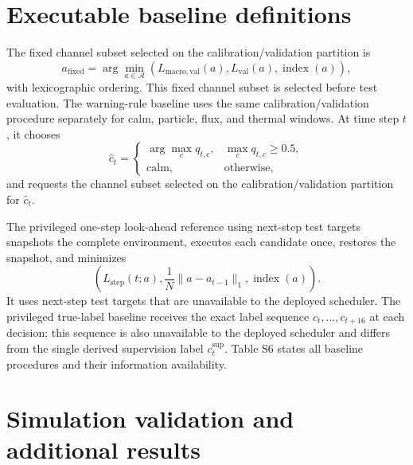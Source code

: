 \documentclass[preprint,12pt]{elsarticle}
\begin{document}


\FloatBarrier
\section{Executable baseline definitions}

The fixed channel subset selected on the calibration/validation partition is
\begin{equation}
  a_{\mathrm{fixed}}
  =\arg\min_{a\in\mathcal{A}}
  \left(L_{\mathrm{macro,val}}(a),
        L_{\mathrm{val}}(a),
        \operatorname{index}(a)\right),
\end{equation}
with lexicographic ordering. This fixed channel subset is selected before test
evaluation. The warning-rule baseline uses the same calibration/validation procedure
separately for calm, particle, flux, and thermal windows. At time step $t$, it chooses
\begin{equation}
  \widehat{c}_t=
  \begin{cases}
    \arg\max_c q_{t,c}, & \max_c q_{t,c}\geq 0.5,\\
    \mathrm{calm}, & \text{otherwise},
  \end{cases}
\end{equation}
and requests the channel subset selected on the calibration/validation partition
for $\widehat{c}_t$.

The privileged one-step look-ahead reference using next-step test targets
snapshots the complete environment, executes each candidate once, restores the
snapshot, and minimizes
\begin{equation}
  \left(
  L_{\mathrm{step}}(t;a),
  \frac{1}{N}\lVert a-a_{t-1}\rVert_1,
  \operatorname{index}(a)
  \right).
\end{equation}
It uses next-step test targets that are unavailable to the deployed scheduler.
The privileged true-label baseline receives the exact label sequence
$c_t,\ldots,c_{t+16}$ at each decision; this sequence is also unavailable to the
deployed scheduler and differs from the single derived supervision label
$c_t^{\mathrm{sup}}$. Table S6 states all baseline procedures and their information
availability.



\FloatBarrier
\section{Simulation validation and additional results}
\end{document}
